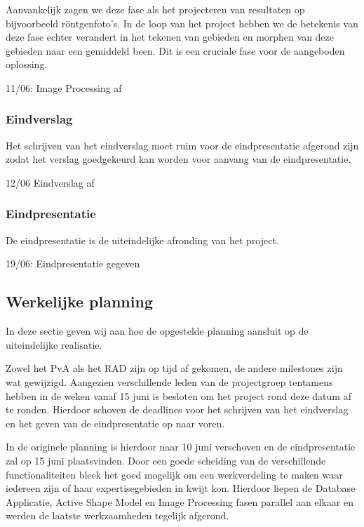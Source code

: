 Aanvankelijk zagen we deze fase als het projecteren van resultaten op
bijvoorbeeld r\"{o}ntgenfoto's. In de loop van het project hebben we de
betekenis van deze fase echter verandert in het tekenen van gebieden en
morphen van deze gebieden naar een gemiddeld been. Dit is een cruciale fase
voor de aangeboden oplossing.

11/06: Image Processing af

\subsubsection{Eindverslag}

Het schrijven van het eindverslag moet ruim voor de eindpresentatie afgerond
zijn zodat het verslag goedgekeurd kan worden voor aanvang van de eindpresentatie.

12/06 Eindverslag af

\subsubsection{Eindpresentatie}

De eindpresentatie is de uiteindelijke afronding van het project.

19/06: Eindpresentatie gegeven

\subsection{Werkelijke planning}
\label{werkelijke_planning}

In deze sectie geven wij aan hoe de opgestelde planning aansluit op de
uiteindelijke realisatie.

Zowel het PvA als het RAD zijn op tijd af gekomen, de andere milestones zijn
wat gewijzigd. Aangezien verschillende leden van de projectgroep tentamens
hebben in de weken vanaf 15 juni is besloten om het project rond deze datum af
te ronden. Hierdoor schoven de deadlines voor het schrijven van het eindverslag
en het geven van de eindpresentatie op naar voren.

In de originele planning is hierdoor naar 10 juni verschoven en de
eindpresentatie zal op 15 juni plaatsvinden.  Door een goede scheiding van de
verschillende functionaliteiten bleek het goed mogelijk om een werkverdeling te
maken waar iedereen zijn of haar expertisegebieden in kwijt kon. Hierdoor
liepen de Database Applicatie, Active Shape Model en Image Processing fasen
parallel aan elkaar en werden de laatste werkzaamheden tegelijk afgerond.

